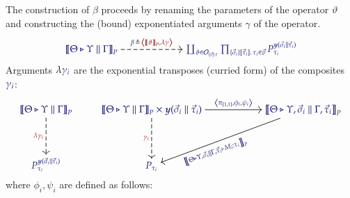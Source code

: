 \documentclass[11pt]{article}
\theoremstyle{definition}
\theoremstyle{remark}
\numberwithin{equation}{section}
\begin{document}
The construction of $\beta$ proceeds by renaming the parameters of the operator
$\vartheta$ and constructing the (bound) exponentiated arguments $\gamma$ of the
operator.
\[
  \begin{tikzcd}[cramped, ampersand replacement = \&]
    {\IMode{
      {\SemBrackets{
        \Theta\triangleright\Upsilon\parallel\Gamma
      }}_{P}
    }}
      \arrow[
        , r
        , dashed
        , "
          \Define{
            \beta\,
          }{
            \,\Tuple{
              \SemBrackets{\vartheta}_P, \lambda\gamma
            }
          }
          "
      ]
\&[4.0em]
    {\IMode{
      \coprod_{
        \vartheta\in \Operators_{\MkArity{\vec{v}}{\tau}}
      }
      \prod_{
        \MkValence{\vec{\sigma}_i}{\vec{\tau}_i}{\tau_i}\in\vec{v}
      }
      P_{\tau_i}^{\Yoneda{\vec{\sigma}_i\parallel\vec{\tau}_i}}
    }}
  \end{tikzcd}
\]
Arguments $\lambda\IMode{{\gamma}_{i}}$ are the exponential transposes (curried
form) of the composites $\IMode{{\gamma}_{i}}$:
\[
  \begin{tikzcd}[cramped, ampersand replacement = \&]
    {\IMode{
      {\SemBrackets{
        \Theta\triangleright\Upsilon\parallel\Gamma
      }}_{P}
    }}
      \arrow[
        , dashed
        , d
        , swap
        , "\OMode{\lambda{\gamma}_{i}}"
      ]
\&
    {\IMode{
      {\SemBrackets{
        \Theta\triangleright\Upsilon\parallel\Gamma
      }}_{P}
      \times
      \Yoneda{
        \vec{\sigma}_{i}\parallel\vec{\tau}_{i}}
      }
    }
      \arrow[
        , r
        , "
          \IMode{
            \Tuple{
              {\pi}_{[1,1]},
              {\phi}_{i},
              {\psi}_{i}
            }
          }
          "
        ]
      \arrow[
        , dashed
        , d
        , swap
        , "\OMode{{\gamma}_{i}}"
      ]
\&[3.5em]
    {\IMode{
      \SemBrackets{
        \Theta\triangleright\Upsilon,
        \vec{\sigma}_i\parallel\Gamma,
        \vec{\tau}_{i}
      }_{P}
    }}
      \ar{dl}[
        , rotate = +19.25
        , xshift = -4.5em
        , yshift = -0.2em
      ]{\IMode{\SemBrackets{\Theta\triangleright\Upsilon,\vec{\sigma}_{i}\parallel\Gamma,\vec{\tau}_{i}\vdash M_i:\tau_i}_P}}
\\[2.0em]
    {\IMode{{P}_{{\tau}_{i}}^{\Yoneda{\vec{\sigma}_{i}\parallel\vec{\tau}_{i}}}}}
\&
    {\IMode{P_{{\tau}_{i}}}}
\&
  \end{tikzcd}
\]
where $\phi_i,\psi_i$ are defined as follows:
\end{document}
